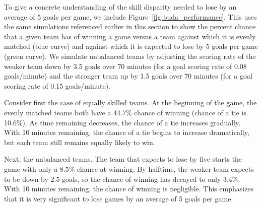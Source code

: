 To give a concrete understanding of the skill disparity needed to lose by an average of 5 goals per game, we include Figure~\ref{fig:buda_performance}.  This uses the same simulations referenced earlier in this section to show the percent chance that a given team has of winning a game versus a team against which it is evenly matched (blue curve) and against which it is expected to lose by 5 goals per game (green curve). We simulate unbalanced teams by adjusting the scoring rate of the weaker team down by 3.5 goals over 70 minutes (for a goal scoring rate of 0.08 goals/minute) and the stronger team up by 1.5 goals over 70 minutes (for a goal scoring rate of 0.15 goals/minute).

Consider first the case of equally skilled teams.  At the beginning of the game, the evenly matched teams both have a 44.7\% chance of winning (chance of a tie is 10.6\%). As time remaining decreases, the chance of a tie increases gradually. With 10 minutes remaining, the chance of a tie begins to increase dramatically, but each team still remains equally likely to win.

Next, the unbalanced teams.  The team that expects to lose by five starts the game with only a 8.5\% chance at winning.  By halftime, the weaker team expects to be down by 2.5 goals, so the chance of winning has decayed to only 3.4\%.  With 10 minutes remaining, the chance of winning is negligible. This emphasizes that it is very significant to lose games by an average of 5 goals per game.